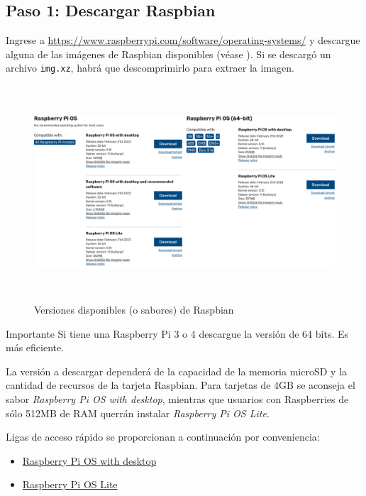 \documentclass[letterpaper,10.5pt]{article}
\begin{document}
%
%
\subsection{Paso 1: Descargar Raspbian}%
\label{sec:step1}
Ingrese a \url{https://www.raspberrypi.com/software/operating-systems/} y descargue alguna de las imágenes de Raspbian disponibles (véase ). Si se descargó un archivo \texttt{img.xz}, habrá que descomprimirlo para extraer la imagen.

\begin{figure}
	\centering%
	\includegraphics[width=0.8\columnwidth,height=8cm,keepaspectratio]{img/p01-01.png} %
	\caption{Versiones disponibles (o sabores) de Raspbian}
	\label{fig:raspbian-flavors} %
\end{figure}

\begin{greenbox}{Importante}
Si tiene una Raspberry Pi 3 o 4 descargue la versión de 64 bits. Es más eficiente.
\end{greenbox}

La versión a descargar dependerá de la capacidad de la memoria microSD y la cantidad de recursos de la tarjeta Raspbian.
Para tarjetas de 4GB se aconseja el sabor \emph{Raspberry Pi OS with desktop}, mientras que usuarios con Raspberries de sólo 512MB de RAM querrán instalar \emph{Raspberry Pi OS Lite}.

Ligas de acceso rápido se proporcionan a continuación por conveniencia:

\begin{itemize}[noitemsep]
	\item \href{https://downloads.raspberrypi.org/raspios_arm64/images/raspios_arm64-2023-02-22/2023-02-21-raspios-bullseye-arm64.img.xz}{Raspberry Pi OS with desktop}
	\item \href{https://downloads.raspberrypi.org/raspios_lite_arm64/images/raspios_lite_arm64-2023-02-22/2023-02-21-raspios-bullseye-arm64-lite.img.xz}{Raspberry Pi OS Lite}
\end{itemize}
\end{document}

